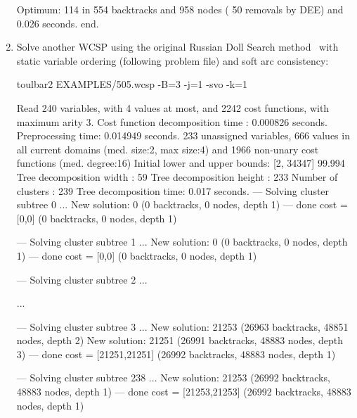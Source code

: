 \begin{enumerate}
{\begin{DoxyCode}
Optimum: 114 in 554 backtracks and 958 nodes ( 50 removals by DEE) and 0.026 seconds.
end.
\end{DoxyCode}}
\item Solve another WCSP using the original Russian Doll Search method~\cite{Verfaillie96} with static variable
ordering (following problem file) and soft arc consistency:
\begin{DoxyCode}
	toulbar2 EXAMPLES/505.wcsp -B=3 -j=1 -svo -k=1
\end{DoxyCode}
{\scriptsize
\begin{DoxyCode}
Read 240 variables, with 4 values at most, and 2242 cost functions, with maximum arity 3.
Cost function decomposition time : 0.000826 seconds.
Preprocessing time: 0.014949 seconds.
233 unassigned variables, 666 values in all current domains (med. size:2, max size:4) and 1966 non-unary cost functions (med. degree:16)
Initial lower and upper bounds: [2, 34347] 99.994%
Tree decomposition width  : 59
Tree decomposition height : 233
Number of clusters        : 239
Tree decomposition time: 0.017 seconds.
--- Solving cluster subtree 0 ...
New solution: 0 (0 backtracks, 0 nodes, depth 1)
---  done  cost = [0,0] (0 backtracks, 0 nodes, depth 1)

--- Solving cluster subtree 1 ...
New solution: 0 (0 backtracks, 0 nodes, depth 1)
---  done  cost = [0,0] (0 backtracks, 0 nodes, depth 1)

--- Solving cluster subtree 2 ...

...

--- Solving cluster subtree 3 ...
New solution: 21253 (26963 backtracks, 48851 nodes, depth 2)
New solution: 21251 (26991 backtracks, 48883 nodes, depth 3)
---  done  cost = [21251,21251] (26992 backtracks, 48883 nodes, depth 1)

--- Solving cluster subtree 238 ...
New solution: 21253 (26992 backtracks, 48883 nodes, depth 1)
---  done  cost = [21253,21253] (26992 backtracks, 48883 nodes, depth 1)


\end{DoxyCode}}
\end{enumerate}
